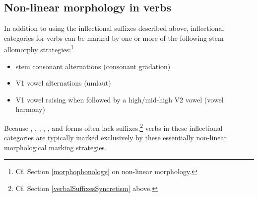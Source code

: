 \subsection{Non-linear morphology in verbs}\label{nonLinearMorphVerbs}
In addition to using the inflectional suffixes described above, inflectional categories for verbs can be marked %
by one or more of the following stem allomorphy strategies:\footnote{Cf. Section \ref{morphophonology} on non-linear morphology.} %
\begin{itemize}
\item{stem consonant alternations (consonant gradation)}
\item{V1 vowel alternations (umlaut)}
\item{V1 vowel raising when followed by a high/mid-high V2 vowel (vowel harmony)}
\end{itemize}
Because , , , , ,  and  forms often lack suffixes,\footnote{Cf. Section \ref{verbalSuffixesSyncretism} above.} 
verbs in these inflectional categories are typically marked exclusively by these essentially non-linear morphological marking strategies. 

